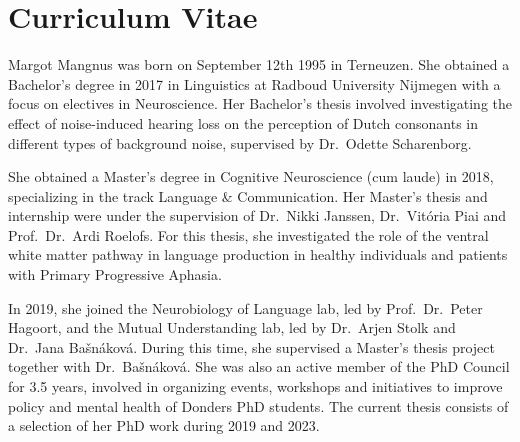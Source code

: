 \chapter*{Curriculum Vitae}
\label{ch:cv}

Margot Mangnus was born on September 12th 1995 in Terneuzen. She obtained a Bachelor's degree in 2017 in Linguistics at Radboud University Nijmegen with a focus on electives in Neuroscience. Her Bachelor's thesis involved investigating the effect of noise-induced hearing loss on the perception of Dutch consonants in different types of background noise, supervised by Dr.~Odette Scharenborg. 

She obtained a Master's degree in Cognitive Neuroscience (cum laude) in 2018, specializing in the track Language \& Communication. Her Master's thesis and internship were under the supervision of Dr.~Nikki Janssen, Dr.~Vit\'{o}ria Piai and Prof.~Dr.~Ardi Roelofs. For this thesis, she investigated the role of the ventral white matter pathway in language production in healthy individuals and patients with Primary Progressive Aphasia. 

In 2019, she joined the Neurobiology of Language lab, led by Prof.~Dr.~Peter Hagoort, and the Mutual Understanding lab, led by Dr.~Arjen Stolk and Dr.~Jana Ba\v{s}n\'{a}kov\'{a}. During this time, she supervised a Master's thesis project together with Dr.~Ba\v{s}n\'{a}kov\'{a}. She was also an active member of the PhD Council for 3.5 years, involved in organizing events, workshops and initiatives to improve policy and mental health of Donders PhD students. The current thesis consists of a selection of her PhD work during 2019 and 2023.